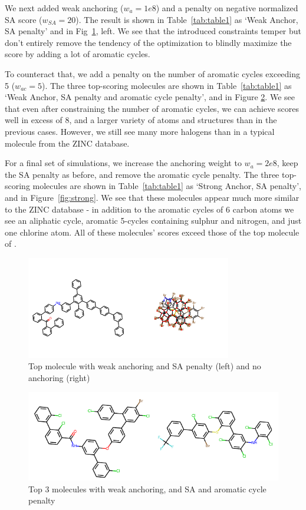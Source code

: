 \documentclass[11pt]{article}
\begin{document}
We next added weak anchoring ($w_{a} =1e8$) and a penalty on negative normalized SA score ($w_{SA}=20$). The result is shown in Table~\ref{tab:table1} as `Weak Anchor, SA penalty' and in Fig~\ref{fig:optim}, left. We see that the introduced constraints temper but don't entirely remove the tendency of the optimization to blindly maximize the score by adding a lot of aromatic cycles.

To counteract that, we add a penalty on the number of aromatic cycles exceeding 5 ($w_{ac}=5$). The three top-scoring molecules are shown in Table~\ref{tab:table1} as `Weak Anchor, SA penalty and aromatic cycle penalty', and in Figure \ref{fig:weak}. We see that even after constraining the number of aromatic cycles, we can achieve scores well in excess of 8, and a larger variety of atoms and structures than in the previous cases. However, we still see many more halogens than in a typical molecule from the ZINC database.

For a final set of simulations, we increase the anchoring weight to $w_{a} =2e8$, keep the SA penalty as before, and remove the aromatic cycle penalty. The three top-scoring molecules are shown in Table~\ref{tab:table1} as `Strong Anchor, SA penalty', and in Figure~\ref{fig:strong}. We see that these molecules appear much more similar to the ZINC database - in addition to the aromatic cycles of 6 carbon atoms we see an aliphatic cycle, aromatic 5-cycles containing sulphur and nitrogen, and just one chlorine atom. All of these molecules' scores exceed those of the top molecule of \cite{jin18}.

\begin{figure}[ht]
	\centering
	\includegraphics[width=0.8\textwidth]{large.pdf}
	\caption{Top molecule with weak anchoring and SA penalty (left) and no anchoring (right)}	\label{fig:optim}
\end{figure}
\begin{figure}[ht]
	\centering
	\includegraphics[width=\textwidth]{weak.pdf}
	\caption{Top 3 molecules with weak anchoring, and SA and aromatic cycle penalty}\label{fig:weak}
\end{figure}
\end{document}
